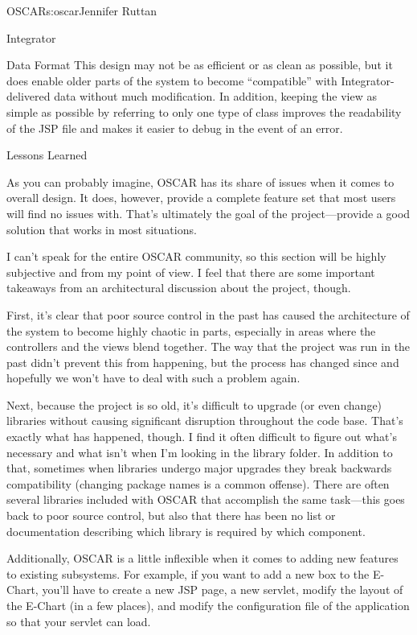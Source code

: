\begin{aosachapter}{OSCAR}{s:oscar}{Jennifer Ruttan}
\begin{aosasect1}{Integrator}
\begin{aosasect2}{Data Format}
This design may not be as efficient or as clean as possible, but it
does enable older parts of the system to become ``compatible'' with
Integrator-delivered data without much modification. In addition,
keeping the view as simple as possible by referring to only one type
of class improves the readability of the JSP file and makes it easier
to debug in the event of an error.

\end{aosasect2}

\end{aosasect1}

\begin{aosasect1}{Lessons Learned}

As you can probably imagine, OSCAR has its share of issues when it
comes to overall design. It does, however, provide a complete feature
set that most users will find no issues with. That's ultimately the
goal of the project---provide a good solution that works in most
situations.

I can't speak for the entire OSCAR community, so this section will be
highly subjective and from my point of view. I feel that there are
some important takeaways from an architectural discussion about the
project, though.

First, it's clear that poor source control in the past has caused the
architecture of the system to become highly chaotic in parts,
especially in areas where the controllers and the views blend
together. The way that the project was run in the past didn't prevent
this from happening, but the process has changed since and hopefully
we won't have to deal with such a problem again.

Next, because the project is so old, it's difficult to upgrade (or
even change) libraries without causing significant disruption
throughout the code base. That's exactly what has happened, though. I
find it often difficult to figure out what's necessary and what isn't
when I'm looking in the library folder. In addition to that, sometimes
when libraries undergo major upgrades they break backwards
compatibility (changing package names is a common offense). There are
often several libraries included with OSCAR that accomplish the same
task---this goes back to poor source control, but also that there has
been no list or documentation describing which library is required by
which component.

Additionally, OSCAR is a little inflexible when it comes to adding new
features to existing subsystems. For example, if you want to add a new
box to the E-Chart, you'll have to create a new JSP page, a new
servlet, modify the layout of the E-Chart (in a few places), and
modify the configuration file of the application so that your servlet
can load.


\end{aosasect1}
\end{aosachapter}
